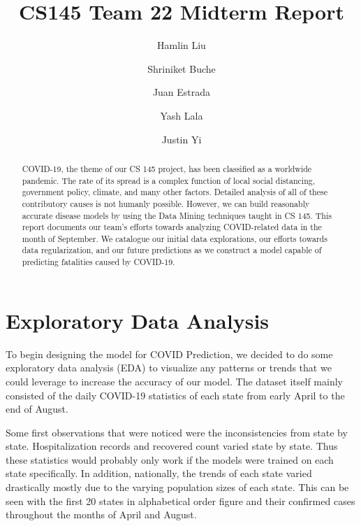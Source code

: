 \documentclass[sigconf,nonacm]{acmart}
\begin{document}
\title{CS145 Team 22 Midterm Report}

\author{Hamlin Liu}

\author{Shriniket Buche}

\author{Juan Estrada}

\author{Yash Lala}

\author{Justin Yi}

\renewcommand{\shortauthors}{Team 22}

\begin{abstract}
COVID-19, the theme of our CS 145 project, has been classified as a worldwide
pandemic. The rate of its spread is a complex function of local social
distancing, government policy, climate, and many other factors. Detailed
analysis of all of these contributory causes is not humanly possible. However,
we can build reasonably accurate disease models by using the Data Mining
techniques taught in CS 145. This report documents our team’s efforts towards
analyzing COVID-related data in the month of September. We catalogue our
initial data explorations, our efforts towards data regularization, and our
future predictions as we construct a model capable of predicting fatalities
caused by COVID-19. 
\end{abstract}

\maketitle

\section{Exploratory Data Analysis}

To begin designing the model for COVID Prediction, we decided to do some
exploratory data analysis (EDA) to visualize any patterns or trends that we
could leverage to increase the accuracy of our model. The dataset itself mainly
consisted of the daily COVID-19 statistics of each state from early April to
the end of August.

Some first observations that were noticed were the inconsistencies from state
by state. Hospitalization records and recovered count varied state by state.
Thus these statistics would probably only work if the models were trained on
each state specifically. In addition, nationally, the trends of each state
varied drastically mostly due to the varying population sizes of each state.
This can be seen with the first 20 states in alphabetical order figure and
their confirmed cases throughout the months of April and August.
\end{document}
